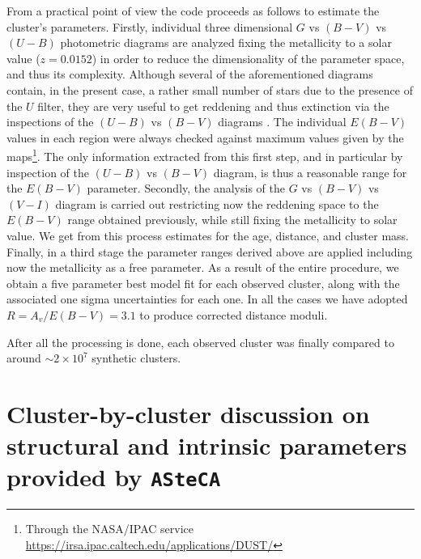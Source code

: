 \documentclass[draft]{aa}
\begin{document}
From a practical point of view the code proceeds as follows to estimate the
cluster's parameters. Firstly, individual three dimensional $G$ vs $(B-V)$ vs $
(U-B)$ photometric diagrams are analyzed fixing the metallicity to a solar
value ($z = 0.0152$) in order to reduce the dimensionality of the parameter
space, and thus its complexity. Although several of the aforementioned diagrams
contain, in the present case, a rather small number of stars due to the
presence of the $U$ filter, they are very useful to get reddening and thus
extinction via the inspections of the $(U-B)$ vs $(B-V)$ diagrams
\citep[e.g.,][]{Vazquez2008} .
The individual $E(B-V)$ values in each region were always checked against
maximum values given by the \cite{Schlafly_2011} maps\footnote{Through the
NASA/IPAC service \url{https://irsa.ipac.caltech.edu/applications/DUST/}}.
The only information extracted from this first step, and in particular
by inspection of the $(U-B)$ vs $(B-V)$ diagram, is thus a reasonable range for
the $E(B-V)$ parameter.
%
Secondly, the analysis of the $G$ vs $(B-V)$ vs $(V-I)$ diagram is carried out
restricting now the reddening space to the $E(B-V)$ range obtained previously,
while still fixing the metallicity to solar value. We get from this process
estimates for the age, distance, and cluster mass.
%
Finally, in a third stage the parameter ranges derived above are applied
including now the metallicity as a free parameter. As a result of the entire
procedure, we obtain a five parameter best model fit for each observed cluster,
along with the associated one sigma uncertainties for each one. In all the
cases we have adopted $R=A_v/E(B-V) = 3.1$ to produce corrected distance moduli.

After all the processing is done, each observed cluster was finally compared to
around $\sim2\times10^7$ synthetic clusters.



\section{Cluster-by-cluster discussion on structural and intrinsic parameters
provided by \texttt{ASteCA}}
\label{sec:cluster_discuss}
\end{document}

